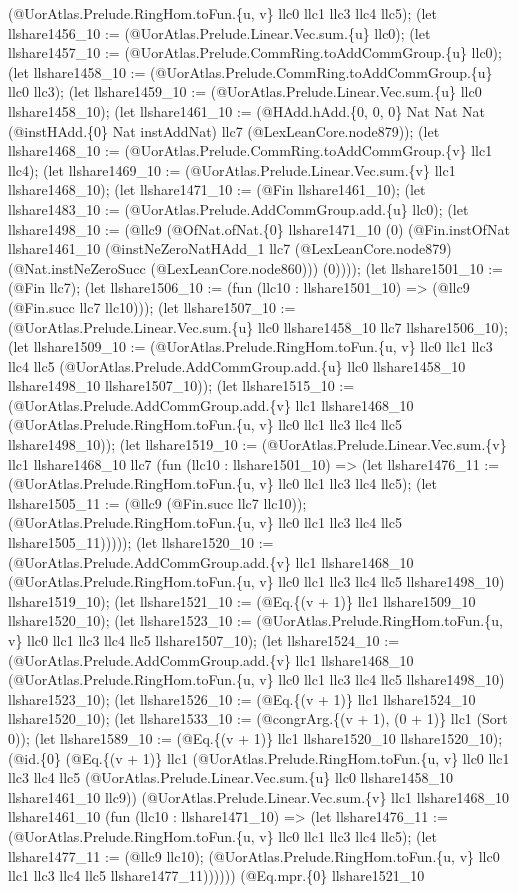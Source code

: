 \documentclass[11pt]{article}
\begin{document}
(@UorAtlas.Prelude.RingHom.toFun.\{u, v\} llc0 llc1 llc3 llc4 llc5); (let llshare1456\_10 := (@UorAtlas.Prelude.Linear.Vec.sum.\{u\} llc0); (let llshare1457\_10 := (@UorAtlas.Prelude.CommRing.toAddCommGroup.\{u\} llc0); (let llshare1458\_10 := (@UorAtlas.Prelude.CommRing.toAddCommGroup.\{u\} llc0 llc3); (let llshare1459\_10 := (@UorAtlas.Prelude.Linear.Vec.sum.\{u\} llc0 llshare1458\_10); (let llshare1461\_10 := (@HAdd.hAdd.\{0, 0, 0\} Nat Nat Nat (@instHAdd.\{0\} Nat instAddNat) llc7 (@LexLeanCore.node879)); (let llshare1468\_10 := (@UorAtlas.Prelude.CommRing.toAddCommGroup.\{v\} llc1 llc4); (let llshare1469\_10 := (@UorAtlas.Prelude.Linear.Vec.sum.\{v\} llc1 llshare1468\_10); (let llshare1471\_10 := (@Fin llshare1461\_10); (let llshare1483\_10 := (@UorAtlas.Prelude.AddCommGroup.add.\{u\} llc0); (let llshare1498\_10 := (@llc9 (@OfNat.ofNat.\{0\} llshare1471\_10 (0) (@Fin.instOfNat llshare1461\_10 (@instNeZeroNatHAdd\_1 llc7 (@LexLeanCore.node879) (@Nat.instNeZeroSucc (@LexLeanCore.node860))) (0)))); (let llshare1501\_10 := (@Fin llc7); (let llshare1506\_10 := (fun (llc10 : llshare1501\_10) => (@llc9 (@Fin.succ llc7 llc10))); (let llshare1507\_10 := (@UorAtlas.Prelude.Linear.Vec.sum.\{u\} llc0 llshare1458\_10 llc7 llshare1506\_10); (let llshare1509\_10 := (@UorAtlas.Prelude.RingHom.toFun.\{u, v\} llc0 llc1 llc3 llc4 llc5 (@UorAtlas.Prelude.AddCommGroup.add.\{u\} llc0 llshare1458\_10 llshare1498\_10 llshare1507\_10)); (let llshare1515\_10 := (@UorAtlas.Prelude.AddCommGroup.add.\{v\} llc1 llshare1468\_10 (@UorAtlas.Prelude.RingHom.toFun.\{u, v\} llc0 llc1 llc3 llc4 llc5 llshare1498\_10)); (let llshare1519\_10 := (@UorAtlas.Prelude.Linear.Vec.sum.\{v\} llc1 llshare1468\_10 llc7 (fun (llc10 : llshare1501\_10) => (let llshare1476\_11 := (@UorAtlas.Prelude.RingHom.toFun.\{u, v\} llc0 llc1 llc3 llc4 llc5); (let llshare1505\_11 := (@llc9 (@Fin.succ llc7 llc10)); (@UorAtlas.Prelude.RingHom.toFun.\{u, v\} llc0 llc1 llc3 llc4 llc5 llshare1505\_11))))); (let llshare1520\_10 := (@UorAtlas.Prelude.AddCommGroup.add.\{v\} llc1 llshare1468\_10 (@UorAtlas.Prelude.RingHom.toFun.\{u, v\} llc0 llc1 llc3 llc4 llc5 llshare1498\_10) llshare1519\_10); (let llshare1521\_10 := (@Eq.\{(v + 1)\} llc1 llshare1509\_10 llshare1520\_10); (let llshare1523\_10 := (@UorAtlas.Prelude.RingHom.toFun.\{u, v\} llc0 llc1 llc3 llc4 llc5 llshare1507\_10); (let llshare1524\_10 := (@UorAtlas.Prelude.AddCommGroup.add.\{v\} llc1 llshare1468\_10 (@UorAtlas.Prelude.RingHom.toFun.\{u, v\} llc0 llc1 llc3 llc4 llc5 llshare1498\_10) llshare1523\_10); (let llshare1526\_10 := (@Eq.\{(v + 1)\} llc1 llshare1524\_10 llshare1520\_10); (let llshare1533\_10 := (@congrArg.\{(v + 1), (0 + 1)\} llc1 (Sort 0)); (let llshare1589\_10 := (@Eq.\{(v + 1)\} llc1 llshare1520\_10 llshare1520\_10); (@id.\{0\} (@Eq.\{(v + 1)\} llc1 (@UorAtlas.Prelude.RingHom.toFun.\{u, v\} llc0 llc1 llc3 llc4 llc5 (@UorAtlas.Prelude.Linear.Vec.sum.\{u\} llc0 llshare1458\_10 llshare1461\_10 llc9)) (@UorAtlas.Prelude.Linear.Vec.sum.\{v\} llc1 llshare1468\_10 llshare1461\_10 (fun (llc10 : llshare1471\_10) => (let llshare1476\_11 := (@UorAtlas.Prelude.RingHom.toFun.\{u, v\} llc0 llc1 llc3 llc4 llc5); (let llshare1477\_11 := (@llc9 llc10); (@UorAtlas.Prelude.RingHom.toFun.\{u, v\} llc0 llc1 llc3 llc4 llc5 llshare1477\_11)))))) (@Eq.mpr.\{0\} llshare1521\_10 
\end{document}
